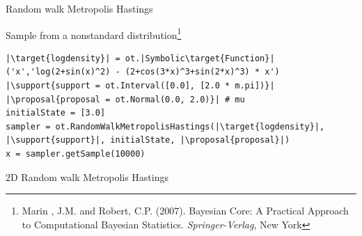 \documentclass{beamer}
\newcommand{\target}[1]{\textcolor{red}{#1}}
\newcommand{\proposal}[1]{\textcolor{blue}{#1}}
\newcommand{\support}[1]{\textcolor{orange}{#1}}
\begin{document}
\begin{frame}[containsverbatim]{Random walk Metropolis Hastings}
\begin{block}{Sample from a nonstandard distribution\footnote{Marin , J.M. and Robert, C.P. (2007). Bayesian Core: A Practical Approach to Computational Bayesian Statistics. \emph{Springer-Verlag}, New York}}
\vspace{-0.4cm}
\begin{lstlisting}
|\target{logdensity}| = ot.|Symbolic\target{Function}|('x','log(2+sin(x)^2) - (2+cos(3*x)^3+sin(2*x)^3) * x')
|\support{support = ot.Interval([0.0], [2.0 * m.pi])}|
|\proposal{proposal = ot.Normal(0.0, 2.0)}| # mu
initialState = [3.0]
sampler = ot.RandomWalkMetropolisHastings(|\target{logdensity}|, |\support{support}|, initialState, |\proposal{proposal}|)
x = sampler.getSample(10000)
\end{lstlisting}
    \end{block}
\end{frame}


\begin{frame}[containsverbatim]{2D Random walk Metropolis Hastings}


\end{frame}
\end{document}

